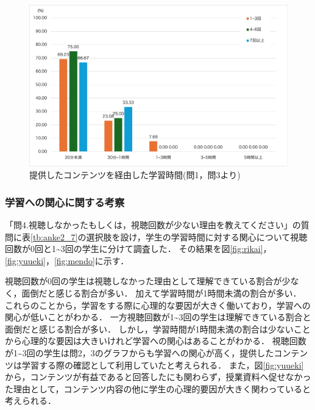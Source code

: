 \documentclass[12pt,a4j,titlepage]{ltjsarticle}
\begin{document}
\begin{figure}[!htb]
  \centering
  \includegraphics[width=15cm]{動画経由.pdf}
  \caption{提供したコンテンツを経由した学習時間(問1，問3より)}
  \label{fig:jikan2}
\end{figure}

\clearpage

\subsubsection{学習への関心に関する考察}

「問4.視聴しなかったもしくは，視聴回数が少ない理由を教えてください」の質問に表\ref{tb:anke2_7}の選択肢を設け，学生の学習時間に対する関心について視聴回数が0回と1\textasciitilde3回の学生に分けて調査した．
その結果を図\ref{fig:rikai}，\ref{fig:yuueki}，\ref{fig:mendo}に示す．

視聴回数が0回の学生は視聴しなかった理由として理解できている割合が少なく，面倒だと感じる割合が多い．
加えて学習時間が1時間未満の割合が多い．
これらのことから，学習をする際に心理的な要因が大きく働いており，学習への関心が低いことがわかる．
一方視聴回数が1\textasciitilde3回の学生は理解できている割合と面倒だと感じる割合が多い．
しかし，学習時間が1時間未満の割合は少ないことから心理的な要因は大きいけれど学習への関心はあることがわかる．
視聴回数が1\textasciitilde3回の学生は問2，3のグラフからも学習への関心が高く，提供したコンテンツは学習する際の確認として利用していたと考えられる．
また，図\ref{fig:yuueki}から，コンテンツが有益であると回答したにも関わらず，授業資料へ促せなかった理由として，コンテンツ内容の他に学生の心理的要因が大きく関わっていると考えられる．
\end{document}
